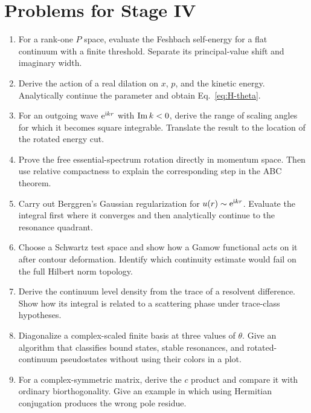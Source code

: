\section{Problems for Stage IV}
\label{problems:stage-IV}

\begin{enumerate}[label=\textbf{IV.\arabic*},leftmargin=*]
  \item For a rank-one $P$ space, evaluate the Feshbach self-energy for a
  flat continuum with a finite threshold.  Separate its principal-value shift
  and imaginary width.

  \item Derive the action of a real dilation on $x$, $p$, and the kinetic
  energy.  Analytically continue the parameter and obtain
  Eq.~\eqref{eq:H-theta}.

  \item For an outgoing wave $\mathrm{e}^{\mathrm{i} kr}$ with $\operatorname{Im} k<0$, derive the range
  of scaling angles for which it becomes square integrable.  Translate the
  result to the location of the rotated energy cut.

  \item Prove the free essential-spectrum rotation directly in momentum
  space.  Then use relative compactness to explain the corresponding step in
  the ABC theorem.

  \item Carry out Berggren's Gaussian regularization for
  $u(r)\sim\mathrm{e}^{\mathrm{i} kr}$.  Evaluate the integral first where it converges and
  then analytically continue to the resonance quadrant.

  \item Choose a Schwartz test space and show how a Gamow functional acts on
  it after contour deformation.  Identify which continuity estimate would
  fail on the full Hilbert norm topology.

  \item Derive the continuum level density from the trace of a resolvent
  difference.  Show how its integral is related to a scattering phase under
  trace-class hypotheses.

  \item Diagonalize a complex-scaled finite basis at three values of $\theta$.
  Give an algorithm that classifies bound states, stable resonances, and
  rotated-continuum pseudostates without using their colors in a plot.

  \item For a complex-symmetric matrix, derive the $c$ product and compare it
  with ordinary biorthogonality.  Give an example in which using Hermitian
  conjugation produces the wrong pole residue.


\end{enumerate}
